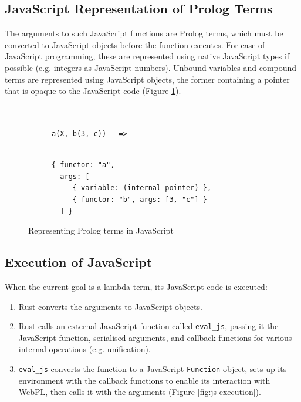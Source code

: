 \subsection{JavaScript Representation of Prolog Terms}

\label{sec:js-prolog-mapping}

The arguments to such JavaScript functions are Prolog terms, which must be converted to JavaScript objects before the function executes. For ease of JavaScript programming, these are represented using native JavaScript types if possible (e.g. integers as JavaScript numbers). Unbound variables and compound terms are represented using JavaScript objects, the former containing a pointer that is opaque to the JavaScript code (Figure \ref{fig:prolog-js-mapping}).

\begin{figure}[H]
\centering
\begin{subfigure}{0.3\textwidth}
\centering
\begin{verbatim}


a(X, b(3, c))   =>


\end{verbatim}
\end{subfigure}%
\begin{subfigure}{0.7\textwidth}
\centering
\begin{verbatim}
{ functor: "a",
  args: [
     { variable: (internal pointer) },
     { functor: "b", args: [3, "c"] }
  ] }
\end{verbatim}
\end{subfigure}
\caption{Representing Prolog terms in JavaScript}
\label{fig:prolog-js-mapping}
\end{figure}

\subsection{Execution of JavaScript}

When the current goal is a lambda term, its JavaScript code is executed:

\begin{enumerate}
\item Rust converts the arguments to JavaScript objects.
\item Rust calls an external JavaScript function called \texttt{eval\_js}, passing it the JavaScript function, serialised arguments, and callback functions for various internal operations (e.g. unification).
\item \texttt{eval\_js} converts the function to a JavaScript \texttt{Function} object, sets up its environment with the callback functions to enable its interaction with WebPL, then calls it with the arguments (Figure \ref{fig:js-execution}).
\end{enumerate}

